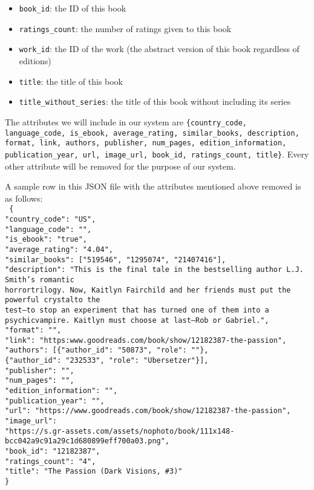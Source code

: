 \documentclass[fontsize=11pt]{article}
\begin{document}
\begin{itemize}
\begin{enumerate}
\begin{itemize}
\item \texttt{book\_id}: the ID of this book
\item \texttt{ratings\_count}: the number of ratings given to this book
\item \texttt{work\_id}: the ID of the work (the abstract version of this book regardless of editions)
\item \texttt{title}: the title of this book
\item \texttt{title\_without\_series}: the title of this book without including its series
\end{itemize}
 
The attributes we will include in our system are \texttt{\{country\_code, language\_code, is\_ebook, average\_rating, similar\_books, description, format, link, authors, publisher, num\_pages, edition\_information, publication\_year, url, image\_url, book\_id, ratings\_count, title\}}. Every other attribute will be removed for the purpose of our system.
 
A sample row in this JSON file with the attributes mentioned above removed is as follows:\\
\texttt{
\{ \\
"country\_code": "US",\\
"language\_code": "",\\
"is\_ebook": "true",\\
"average\_rating": "4.04",\\
"similar\_books": ["519546", "1295074", "21407416"],\\
"description": "This is the final tale in the bestselling author L.J. Smith's romantic \\horrortrilogy. Now, Kaitlyn Fairchild and her friends must put the powerful crystalto the \\
test--to stop an experiment that has turned one of them into a psychicvampire. Kaitlyn must choose at last--Rob or Gabriel.",\\
"format": "",\\
"link": "https:\text{//}www.goodreads.com/book/show/12182387-the-passion",\\
"authors": [\{"author\_id": "50873", "role": ""\}, \\
\{"author\_id": "232533", "role": "Ubersetzer"\}],\\
"publisher": "",\\
"num\_pages": "",\\
"edition\_information": "",\\
"publication\_year": "",\\
"url": "https://www.goodreads.com/book/show/12182387-the-passion",\\
"image\_url": \\
"https://s.gr-assets.com/assets/nophoto/book/111x148-bcc042a9c91a29c1d680899eff700a03.png",\\
"book\_id": "12182387",\\
"ratings\_count": "4",\\
"title": "The Passion (Dark Visions, \#3)" \\
\}
} \\


\end{enumerate}
\end{itemize}
\end{document}
